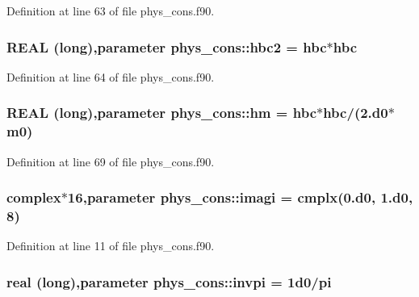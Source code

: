Definition at line 63 of file phys\_\-cons.f90.

\hypertarget{namespacephys__cons_af78d210174277076bb64ff4403f8c9fd}{
\subsubsection[{hbc2}]{\setlength{\rightskip}{0pt plus 5cm}REAL (long),parameter {\bf phys\_\-cons::hbc2} = {\bf hbc}$\ast${\bf hbc}}}
\label{namespacephys__cons_af78d210174277076bb64ff4403f8c9fd}


Definition at line 64 of file phys\_\-cons.f90.

\hypertarget{namespacephys__cons_ad97ad749ef4f8f66c56a0facb7394cb5}{
\subsubsection[{hm}]{\setlength{\rightskip}{0pt plus 5cm}REAL (long),parameter {\bf phys\_\-cons::hm} = {\bf hbc}$\ast${\bf hbc}/(2.d0$\ast${\bf m0})}}
\label{namespacephys__cons_ad97ad749ef4f8f66c56a0facb7394cb5}


Definition at line 69 of file phys\_\-cons.f90.

\hypertarget{namespacephys__cons_a0dbb22856790b16e206de451e9cdd74a}{
\subsubsection[{imagi}]{\setlength{\rightskip}{0pt plus 5cm}complex$\ast$16,parameter {\bf phys\_\-cons::imagi} = cmplx(0.d0, 1.d0, 8)}}
\label{namespacephys__cons_a0dbb22856790b16e206de451e9cdd74a}


Definition at line 11 of file phys\_\-cons.f90.

\hypertarget{namespacephys__cons_aa8683f00f4216acc1822dfcb85b1ee00}{
\subsubsection[{invpi}]{\setlength{\rightskip}{0pt plus 5cm}real (long),parameter {\bf phys\_\-cons::invpi} = 1d0/pi}}
\label{namespacephys__cons_aa8683f00f4216acc1822dfcb85b1ee00}


